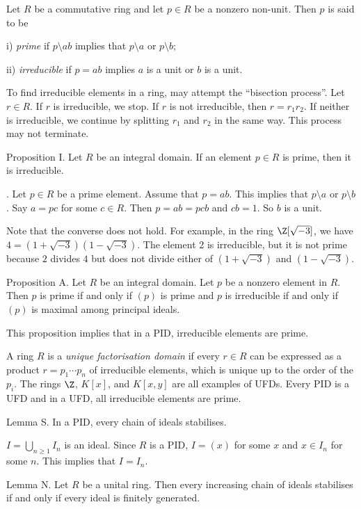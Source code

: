 Let $R$ be a commutative ring and let $p\in R$ be a nonzero non-unit. Then $p$ is said to be
\medskip
\item{i)} {\it prime} if $p\setminus ab$ implies that $p\setminus a$ or $p\setminus b$;
\smallskip
\item{ii)} {\it irreducible} if $p=ab$ implies $a$ is a unit or $b$ is a unit.
\medskip

To find irreducible elements in a ring, may attempt the ``bisection process''. Let $r\in R$. If $r$ is irreducible, we stop. If $r$ is not irreducible, then $r = r_1 r_2$. If neither is irreducible, we continue by splitting $r_1$ and $r_2$ in the same way. This process may not terminate.

\proclaim Proposition I. Let $R$ be an integral domain. If an element $p\in R$ is prime, then it is irreducible.

\proof. Let $p\in R$ be a prime element. Assume that $p=ab$. This implies that $p\setminus a$ or $p\setminus b$. Say $a = pc$ for some $c\in R$. Then $p=ab=pcb$ and $cb = 1$. So $b$ is a unit.\slug

Note that the converse does not hold. For example, in the ring $\Z[\sqrt{-3}]$, we have $4=(1+\sqrt {-3})(1-\sqrt {-3})$. The element 2 is irreducible, but it is not prime because $2$ divides $4$ but does not divide either of $(1+\sqrt{-3})$ and $(1-\sqrt{-3})$.

\proclaim Proposition A. Let $R$ be an integral domain. Let $p$ be a nonzero element in $R$. Then $p$ is prime if and only if $(p)$ is prime and $p$ is irreducible if and only if $(p)$ is maximal among principal ideals.\slug

This proposition implies that in a PID, irreducible elements are prime.

A ring $R$ is a {\it unique factorisation domain} if every $r\in R$ can be expressed as a product $r = p_1\cdots p_n$ of irreducible elements, which is unique up to the order of the $p_i$. The rings $\Z$, $K[x]$, and $K[x,y]$ are all examples of UFDs. Every PID is a UFD and in a UFD, all irreducible elements are prime.

\proclaim Lemma S. In a PID, every chain of ideals stabilises.

\proof $I = \bigcup_{n\geq 1} I_n$ is an ideal. Since $R$ is a PID, $I = (x)$ for some $x$ and $x\in I_n$ for some $n$. This implies that $I = I_n$.\slug

\proclaim Lemma N. Let $R$ be a unital ring. Then every increasing chain of ideals stabilises if and only if every ideal is finitely generated.

